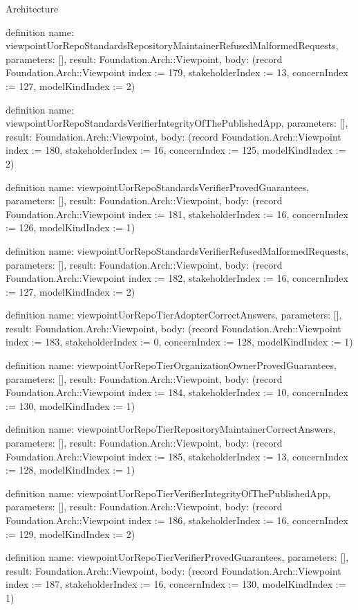 \begin{lexlean}{Architecture}
\begin{semanticmodule}
definition{
  name: viewpointUorRepoStandardsRepositoryMaintainerRefusedMalformedRequests,
  parameters: [],
  result: Foundation.Arch::Viewpoint,
  body: (record Foundation.Arch::Viewpoint {index := 179, stakeholderIndex := 13, concernIndex := 127, modelKindIndex := 2})
}

definition{
  name: viewpointUorRepoStandardsVerifierIntegrityOfThePublishedApp,
  parameters: [],
  result: Foundation.Arch::Viewpoint,
  body: (record Foundation.Arch::Viewpoint {index := 180, stakeholderIndex := 16, concernIndex := 125, modelKindIndex := 2})
}

definition{
  name: viewpointUorRepoStandardsVerifierProvedGuarantees,
  parameters: [],
  result: Foundation.Arch::Viewpoint,
  body: (record Foundation.Arch::Viewpoint {index := 181, stakeholderIndex := 16, concernIndex := 126, modelKindIndex := 1})
}

definition{
  name: viewpointUorRepoStandardsVerifierRefusedMalformedRequests,
  parameters: [],
  result: Foundation.Arch::Viewpoint,
  body: (record Foundation.Arch::Viewpoint {index := 182, stakeholderIndex := 16, concernIndex := 127, modelKindIndex := 2})
}

definition{
  name: viewpointUorRepoTierAdopterCorrectAnswers,
  parameters: [],
  result: Foundation.Arch::Viewpoint,
  body: (record Foundation.Arch::Viewpoint {index := 183, stakeholderIndex := 0, concernIndex := 128, modelKindIndex := 1})
}

definition{
  name: viewpointUorRepoTierOrganizationOwnerProvedGuarantees,
  parameters: [],
  result: Foundation.Arch::Viewpoint,
  body: (record Foundation.Arch::Viewpoint {index := 184, stakeholderIndex := 10, concernIndex := 130, modelKindIndex := 1})
}

definition{
  name: viewpointUorRepoTierRepositoryMaintainerCorrectAnswers,
  parameters: [],
  result: Foundation.Arch::Viewpoint,
  body: (record Foundation.Arch::Viewpoint {index := 185, stakeholderIndex := 13, concernIndex := 128, modelKindIndex := 1})
}

definition{
  name: viewpointUorRepoTierVerifierIntegrityOfThePublishedApp,
  parameters: [],
  result: Foundation.Arch::Viewpoint,
  body: (record Foundation.Arch::Viewpoint {index := 186, stakeholderIndex := 16, concernIndex := 129, modelKindIndex := 2})
}

definition{
  name: viewpointUorRepoTierVerifierProvedGuarantees,
  parameters: [],
  result: Foundation.Arch::Viewpoint,
  body: (record Foundation.Arch::Viewpoint {index := 187, stakeholderIndex := 16, concernIndex := 130, modelKindIndex := 1})
}


\end{semanticmodule}
\end{lexlean}
